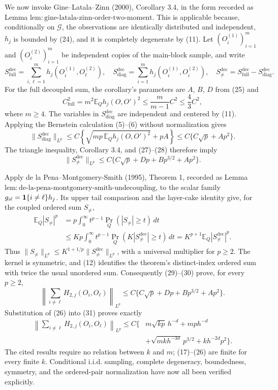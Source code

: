 We now invoke Gine--Latala--Zinn (2000), Corollary 3.4, in the form recorded as Lemma \(\mathrm{lem{:}gine\text{-}latala\text{-}zinn\text{-}order\text{-}two\text{-}moment}\).  This is applicable because, conditionally on \(\mathcal G\), the observations are identically distributed and independent, \(h_j\) is bounded by (24), and it is completely degenerate by (11).  Let \((O_i^{(1)})_{i=1}^m\) and \((O_i^{(2)})_{i=1}^m\) be independent copies of the main-block sample, and write
\[
 S_{\mathrm{full}}^{\mathrm{dec}}=\sum_{i,\ell=1}^m h_j(O_i^{(1)},O_\ell^{(2)}),
 \quad
 S_{\mathrm{diag}}^{\mathrm{dec}}=\sum_{i=1}^m h_j(O_i^{(1)},O_i^{(2)}),
 \quad
 S_{\ne}^{\mathrm{dec}}=S_{\mathrm{full}}^{\mathrm{dec}}-S_{\mathrm{diag}}^{\mathrm{dec}}.
\]
For the full decoupled sum, the corollary's parameters are \(A\), \(B\), \(D\) from (25) and
\[
 C_{\mathrm{full}}^2=m^2\mathbb E_Qh_j(O,O')^2
 \leq\frac{m}{m-1}C^2\leq\frac43C^2,
\tag{27}
\]
where \(m\geq4\).  The variables in \(S_{\mathrm{diag}}^{\mathrm{dec}}\) are independent and centered by (11).  Applying the Bernstein calculation (5)--(6) without normalization gives
\[
 \|S_{\mathrm{diag}}^{\mathrm{dec}}\|_{L^p}
 \leq C\left\{\sqrt{mp\,\mathbb E_Qh_j(O,O')^2}+pA\right\}
 \leq C\{C\sqrt p+Ap^2\}.
\tag{28}
\]
The triangle inequality, Corollary 3.4, and (27)--(28) therefore imply
\[
 \|S_{\ne}^{\mathrm{dec}}\|_{L^p}
 \leq C\{C\sqrt p+Dp+Bp^{3/2}+Ap^2\}.
\tag{29}
\]

Apply de la Pena--Montgomery-Smith (1995), Theorem 1, recorded as Lemma \(\mathrm{lem{:}de\text{-}la\text{-}pena\text{-}montgomery\text{-}smith\text{-}undecoupling}\), to the scalar family \(g_{i\ell}={\bf1}\{i\ne\ell\}h_j\).  Its upper tail comparison and the layer-cake identity give, for the coupled ordered sum \(S_\ne\),
\[
 \begin{aligned}
 \mathbb E_Q|S_\ne|^p
 &=p\int_0^\infty t^{p-1}\Pr_Q(|S_\ne|\geq t)\,dt\\
 &\leq Kp\int_0^\infty t^{p-1}
       \Pr_Q(K|S_{\ne}^{\mathrm{dec}}|\geq t)\,dt
 =K^{p+1}\mathbb E_Q|S_{\ne}^{\mathrm{dec}}|^p.
 \end{aligned}
\tag{30}
\]
Thus \(\|S_\ne\|_{L^p}\leq K^{1+1/p}\|S_{\ne}^{\mathrm{dec}}\|_{L^p}\), with a universal multiplier for \(p\geq2\).  The kernel is symmetric, and (12) identifies the theorem's distinct-index ordered sum with twice the usual unordered sum.  Consequently (29)--(30) prove, for every \(p\geq2\),
\[
 \left\|\sum_{i\ne\ell}H_{2,j}(O_i,O_\ell)\right\|_{L^p}
 \leq C\{C\sqrt p+Dp+Bp^{3/2}+Ap^2\}.
\tag{31}
\]
Substitution of (26) into (31) proves exactly
\[
 \begin{aligned}
 \left\|\sum_{i\ne\ell}H_{2,j}(O_i,O_\ell)\right\|_{L^p}
 \leq C\{&m\sqrt{kp}\,h^{-d}+mp h^{-d}\\
 &+\sqrt{mk h^{-3d}}\,p^{3/2}+kh^{-2d}p^2\}.
 \end{aligned}
\tag{32}
\]
The cited results require no relation between \(k\) and \(m\); (17)--(26) are finite for every finite \(k\).  Conditional i.i.d. sampling, complete degeneracy, boundedness, symmetry, and the ordered-pair normalization have now all been verified explicitly.

